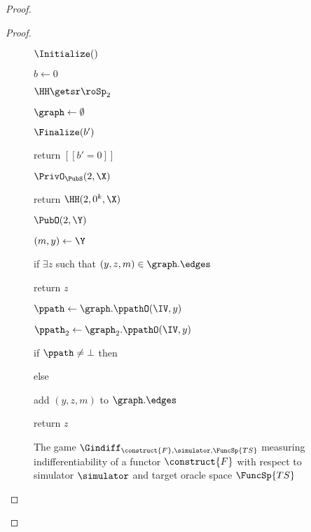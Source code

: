 \begin{proof}
\begin{proof}
\begin{figure}
{				\begin{algorithm}{$\Initialize()$}
					\item $b \gets 0$
					\item $\HH \getsr \roSp_2$
					\item {}
					\item $\graph \gets \emptyset$
				\end{algorithm}
				\ExptSepSpace
			\begin{algorithm}{$\Finalize(b')$}
				\item {}
				\item return $[[b' = 0]]$
			\end{algorithm}
		\begin{algorithm}{$\PrivO_{\PubS}(2, \X)$}
			\item return $\HH(2, 0^k, \X)$
		\end{algorithm}	
				
			}
			{	\ExptSepSpace
				\begin{algorithm}{$\PubO(2,\Y)$}
					\item $(m, y) \gets \Y$
					\item if $\exists z$ such that $(y, z, m) \in \graph.\edges$
					\item \quad return $z$
					\item $\ppath \gets \graph.\ppathO(\IV, y)$
					\item $\ppath_2 \gets \graph_2.\ppathO(\IV, y)$
					\item if $\ppath \neq \bot$ then 
					\item \quad {}
					\item else  
					\item {}
					\item \quad {}
					\item add $(y, z, m)$ to $\graph.\edges$
					\item return $z$
				\end{algorithm}
			}
			\vspace{5pt}
			\caption{The game  $\Gindiff_{\construct{F}, \simulator, \FuncSp{TS}}$ measuring indifferentiability of a functor $\construct{F}$ with respect to simulator $\simulator$ and target oracle space $\FuncSp{TS}$}
			\label{fig-lemma-gm3}
		\end{figure}
		

\end{proof}
\end{proof}
